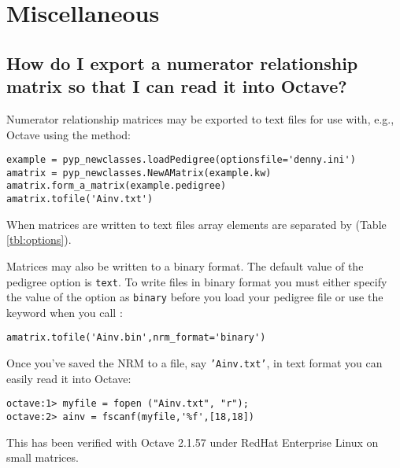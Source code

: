 \section{Miscellaneous}
\label{sec:howto-miscellaneous}
\subsection{How do I export a numerator relationship matrix so that I can read it into Octave?}
\label{sec:howto-export-nrm-to-octave}
Numerator relationship matrices may be exported to text files for use with, e.g., Octave using the  method:
\begin{verbatim}
example = pyp_newclasses.loadPedigree(optionsfile='denny.ini')
amatrix = pyp_newclasses.NewAMatrix(example.kw)
amatrix.form_a_matrix(example.pedigree)
amatrix.tofile('Ainv.txt')
\end{verbatim}
When matrices are written to text files array elements are separated by  (Table \ref{tbl:options}).

Matrices may also be written to a binary format. The default value of the  pedigree option is \texttt{text}. To write files in binary format you must either specify the  value of the  option as \texttt{binary} before you load your pedigree file or use the  keyword when you call :
\begin{verbatim}
amatrix.tofile('Ainv.bin',nrm_format='binary')
\end{verbatim}
Once you've saved the NRM to a file, say \texttt{'Ainv.txt'}, in text format you can easily read it into Octave:
\begin{verbatim}
octave:1> myfile = fopen ("Ainv.txt", "r");
octave:2> ainv = fscanf(myfile,'%f',[18,18])
\end{verbatim}
This has been verified with Octave 2.1.57 under RedHat Enterprise Linux on small matrices.
